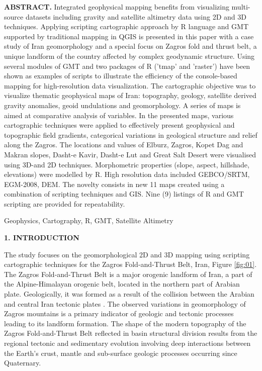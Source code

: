 \documentclass[12pt,a4paper,oneside]{article}
\def \newsection{\vspace{12pt}\textbf}
\def \newpar{\vspace{6pt}}
\begin{document}
{\bf ABSTRACT.} Integrated geophysical mapping benefits from visualizing multi-source datasets including gravity and satellite altimetry data using 2D and 3D techniques. Applying scripting cartographic approach by R language and GMT supported by traditional mapping in QGIS is presented in this paper with a case study of Iran geomorphology and a special focus on Zagros fold and thrust belt, a unique landform of the country affected by complex geodynamic structure. Using several modules of GMT and two packages of R ('tmap' and 'raster') have been shown as examples of scripts to illustrate the efficiency of the console-based mapping for high-resolution data visualization. The cartographic objective was to visualize thematic geophysical maps of Iran: topography, geology, satellite derived gravity anomalies, geoid undulations and geomorphology. A series of maps is aimed at comparative analysis of variables. In the presented maps, various cartographic techniques were applied to effectively present geophysical and topographic field gradients, categorical variations in geological structure and relief along the Zagros. The locations and values of Elburz, Zagros, Kopet Dag and Makran slopes, Dasht-e Kavir, Dasht-e Lut and Great Salt Desert were visualised using 3D-and 2D techniques. Morphometric properties (slope, aspect, hillshade, elevations) were modelled by R. High resolution data included GEBCO/SRTM, EGM-2008, DEM. The novelty consists in new 11 maps created using a combination of scripting techniques and GIS. Nine (9) listings of R and GMT scripting are provided for repeatability.

\newpar {\bf Keywords:} Geophysics, Cartography, R, GMT, Satellite Altimetry


\newsection {1. INTRODUCTION}

\newpar The study focuses on the geomorphological 2D and 3D mapping using scripting cartographic techniques for the Zagros Fold-and-Thrust Belt, Iran, Figure \ref{fig:01}. The Zagros Fold-and-Thrust Belt is a major orogenic landform of Iran, a part of the Alpine-Himalayan orogenic belt, located in the northern part of Arabian plate. Geologically, it was formed as a result of the collision between the Arabian and central Iran tectonic plates \citep{Jahani}. The observed variations in geomorphology of Zagros mountains is a primary indicator of geologic and tectonic processes leading to its landform formation. The shape of the modern topography of the Zagros Fold-and-Thrust Belt reflected in basin structural division results from the regional tectonic and sedimentary evolution involving deep interactions between the Earth's crust, mantle and sub-surface geologic processes occurring since Quaternary. 
\end{document}

